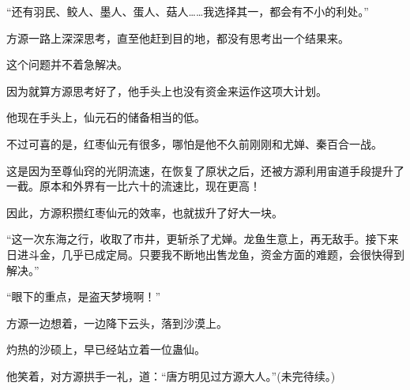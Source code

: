 \begin{this_body}
“还有羽民、鲛人、墨人、蛋人、菇人……我选择其一，都会有不小的利处。”

方源一路上深深思考，直至他赶到目的地，都没有思考出一个结果来。

这个问题并不着急解决。

因为就算方源思考好了，他手头上也没有资金来运作这项大计划。

他现在手头上，仙元石的储备相当的低。

不过可喜的是，红枣仙元有很多，哪怕是他不久前刚刚和尤婵、秦百合一战。

这是因为至尊仙窍的光阴流速，在恢复了原状之后，还被方源利用宙道手段提升了一截。原本和外界有一比六十的流速比，现在更高！

因此，方源积攒红枣仙元的效率，也就拔升了好大一块。

“这一次东海之行，收取了市井，更斩杀了尤婵。龙鱼生意上，再无敌手。接下来日进斗金，几乎已成定局。只要我不断地出售龙鱼，资金方面的难题，会很快得到解决。”

“眼下的重点，是盗天梦境啊！”

方源一边想着，一边降下云头，落到沙漠上。

灼热的沙硕上，早已经站立着一位蛊仙。

他笑着，对方源拱手一礼，道：“唐方明见过方源大人。”(未完待续。)

\end{this_body}

